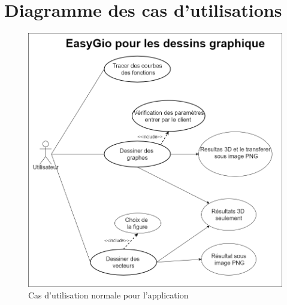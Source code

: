\documentclass[a4paper]{report}
\begin{document}
\section{Diagramme des cas d'utilisations}
\begin{figure}[!h]
    \centering
    \includegraphics[width=14cm]{images/MY UML.PNG}
    \caption{Cas d'utilisation normale pour l'application}
    \label{fig:Cas d'utilisation normale pour l'application}
\end{figure}
\newpage
\end{document}

